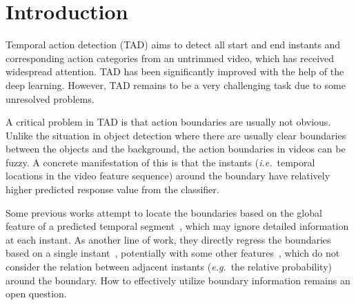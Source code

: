 \documentclass[10pt,twocolumn,letterpaper]{article}
\def\ie{{\em i.e.}}
\def\eg{{\em e.g.}}
\begin{document}
\begin{figure}[t]
\end{figure}



\section{Introduction}
\label{sec:intro}


Temporal action detection (TAD) aims to detect all start and end instants and corresponding action categories from an untrimmed video, which has received widespread attention. TAD has been significantly improved with the help of the deep learning. 
However, TAD remains to be a very challenging  task due to some unresolved problems.

A critical problem in TAD is that action boundaries are usually not obvious. 
Unlike the situation in object detection where there are usually clear boundaries between the objects and the background, the action boundaries in videos can be fuzzy. A concrete manifestation of this is that the instants (\ie~temporal locations in the video feature sequence) around the boundary have relatively higher predicted response value from the classifier. 





Some previous works attempt to locate the boundaries based on the global feature of a predicted temporal segment~\cite{lin2018bsn,lin2019bmn, zeng2019graph,zhao2020bottom,long2019gaussian},
which may ignore detailed information at each instant.
As another line of work, they directly regress the boundaries based on a single instant~\cite{zhang2022actionformer,paul2018w}, potentially with some other features~\cite{lin2021learning,qing2021temporal,zhao2021video}, which do not consider the relation between adjacent instants (\eg~the relative probability) around the boundary.  
How to effectively utilize boundary information remains an open question. 
\end{document}
